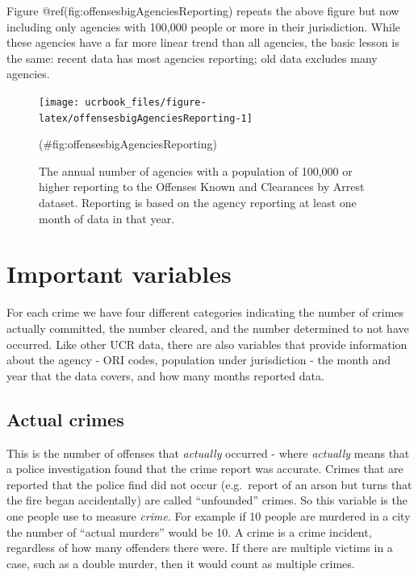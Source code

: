 \documentclass[
  12pt,
  openany]{book}
\begin{document}
Figure @ref(fig:offensesbigAgenciesReporting) repeats the above figure but now including only agencies with 100,000 people or more in their jurisdiction. While these agencies have a far more linear trend than all agencies, the basic lesson is the same: recent data has most agencies reporting; old data excludes many agencies.

\begin{figure}

{\centering \texttt{[image: ucrbook\_files/figure-latex/offensesbigAgenciesReporting-1]} 

}

\caption{The annual number of agencies with a population of 100,000 or higher reporting to the Offenses Known and Clearances by Arrest dataset. Reporting is based on the agency reporting at least one month of data in that year.}(\#fig:offensesbigAgenciesReporting)
\end{figure}

\hypertarget{important-variables}{%
\section{Important variables}\label{important-variables}}

For each crime we have four different categories indicating the number of crimes actually committed, the number cleared, and the number determined to not have occurred. Like other UCR data, there are also variables that provide information about the agency - ORI codes, population under jurisdiction - the month and year that the data covers, and how many months reported data.

\hypertarget{actual}{%
\subsection{Actual crimes}\label{actual}}

This is the number of offenses that \emph{actually} occurred - where \emph{actually} means that a police investigation found that the crime report was accurate. Crimes that are reported that the police find did not occur (e.g.~report of an arson but turns that the fire began accidentally) are called ``unfounded'' crimes. So this variable is the one people use to measure \emph{crime}. For example if 10 people are murdered in a city the number of ``actual murders'' would be 10. A crime is a crime incident, regardless of how many offenders there were. If there are multiple victims in a case, such as a double murder, then it would count as multiple crimes.
\end{document}
